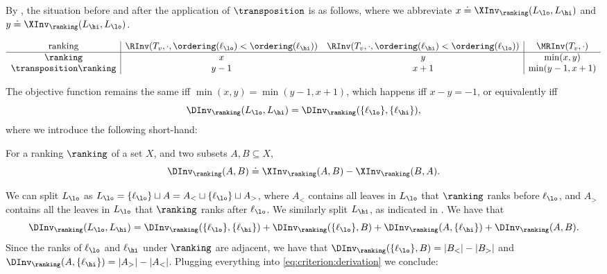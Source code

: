 By , the situation before and after the application of $\transposition$ is as follows, where we abbreviate $x \doteq \XInv_\ranking(L_\lo,L_\hi)$ and $y \doteq \XInv_\ranking(L_\hi,L_\lo)$. 

\begin{equation*}
    \begin{array}{c|cc|c}
      \text{ranking} & \RInv(T_v,\cdot, \ordering(\ell_\lo) < \ordering(\ell_\hi)) &  \RInv(T_v,\cdot, \ordering(\ell_\hi) < \ordering(\ell_\lo)) & \MRInv(T_v,\cdot) \\
      \hline
      \ranking & x & y & \min(x,y) \\
      \transposition \ranking & y-1 & x+1 & \min(y-1,x+1)
    \end{array}
\end{equation*}

The objective function remains the same iff $\min(x,y) = \min(y-1,x+1)$, which happens iff $x-y=-1$, or equivalently iff
\begin{equation}\label{eq:criterion:derivation}
\DInv_\ranking(L_\lo,L_\hi) = \DInv_\ranking(\{\ell_\lo\},\{\ell_\hi\}),
\end{equation}
where we introduce the following short-hand: 
\begin{definition}
For a ranking $\ranking$ of a set $X$, and two subsets $A, B \subseteq X$,
\[ \DInv_\ranking(A,B) \doteq \XInv_\ranking(A,B) - \XInv_\ranking(B,A). \]
\end{definition}
We can split $L_\lo$ as $L_\lo = \{\ell_\lo\} \sqcup A = A_< \sqcup \{\ell_\lo\} \sqcup A_>$, where $A_<$ contains all leaves in $L_\lo$ that $\ranking$ ranks before $\ell_\lo$, and $A_>$ contains all the leaves in $L_\lo$ that $\ranking$ ranks after $\ell_\lo$. We similarly split $L_\hi$, as indicated in . We have that
\[ \DInv_\ranking(L_\lo,L_\hi) = \DInv_\ranking(\{\ell_\lo\},\{\ell_\hi\}) + \DInv_\ranking(\{\ell_\lo\},B) + \DInv_\ranking(A,\{\ell_\hi\}) + \DInv_\ranking(A,B).\]
Since the ranks of $\ell_\lo$ and $\ell_\hi$ under $\ranking$ are adjacent, we have that $\DInv_\ranking(\{\ell_\lo\},B) = |B_<| - |B_>|$ and $\DInv_\ranking(A,\{\ell_\hi\}) = |A_>| - |A_<|$. Plugging everything into \eqref{eq:criterion:derivation} we conclude:

